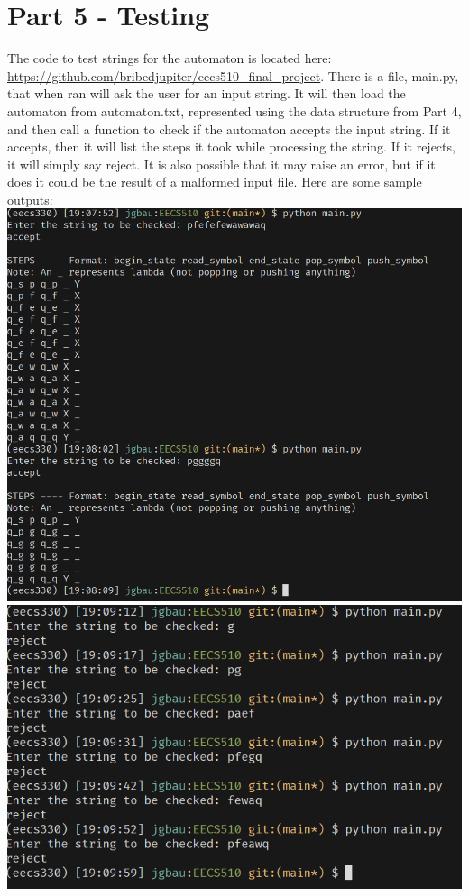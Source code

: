\documentclass{article}
\begin{document}
\section{Part 5 - Testing}
The code to test strings for the automaton is located here:
\url{https://github.com/bribedjupiter/eecs510_final_project}. There is a file, main.py, that when ran will ask the user for an input string. It will then load the automaton from automaton.txt, represented using the data structure from Part 4, and then call a function to check if the automaton accepts the input string. If it accepts, then it will list the steps it took while processing the string. If it rejects, it will simply say reject. It is also possible that it may raise an error, but if it does it could be the result of a malformed input file. Here are some sample outputs:
\includegraphics[width=\textwidth]{part5-accept.png}
\includegraphics[width=\textwidth]{part5-reject.png}
\end{document}
